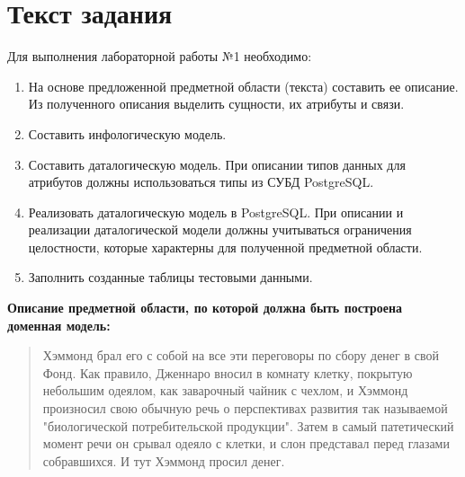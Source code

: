 \section{Текст задания}
Для выполнения лабораторной работы №1 необходимо:

\begin{enumerate}
    \item На основе предложенной предметной области (текста) составить ее описание. Из полученного описания выделить сущности, их атрибуты и связи.
    \item Составить инфологическую модель.
    \item Составить даталогическую модель. При описании типов данных для атрибутов должны использоваться типы из СУБД PostgreSQL.
    \item Реализовать даталогическую модель в PostgreSQL. При описании и реализации даталогической модели должны учитываться ограничения целостности, которые характерны для полученной предметной области.
    \item Заполнить созданные таблицы тестовыми данными.
\end{enumerate}

\textbf{Описание предметной области, по которой должна быть построена доменная модель:}
\begin{quote}
    Хэммонд брал его с собой на все эти переговоры по сбору денег в свой Фонд.
    Как правило, Дженнаро вносил в комнату клетку, покрытую небольшим одеялом,
    как заварочный чайник с чехлом, и Хэммонд произносил свою обычную речь о
    перспективах развития так называемой "биологической потребительской продукции".
    Затем в самый патетический момент речи он срывал одеяло с клетки,
    и слон представал перед глазами собравшихся. И тут Хэммонд просил денег.
\end{quote}
